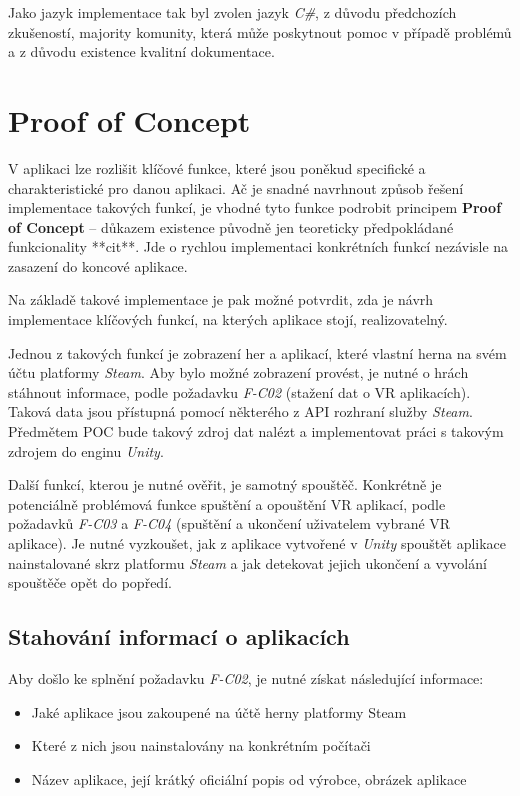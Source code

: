 Jako jazyk implementace tak byl zvolen jazyk \emph{C\#}, z důvodu
předchozích zkušeností, majority komunity, která může poskytnout pomoc v
případě problémů a z důvodu existence kvalitní dokumentace.

\section{Proof of Concept}\label{proof-of-concept}

V aplikaci lze rozlišit klíčové funkce, které jsou poněkud specifické a
charakteristické pro danou aplikaci. Ač je snadné navrhnout způsob
řešení implementace takových funkcí, je vhodné tyto funkce podrobit
principem \textbf{Proof of Concept} -- důkazem existence původně jen
teoreticky předpokládané funkcionality **cit**. Jde o rychlou implementaci
konkrétních funkcí nezávisle na zasazení do koncové aplikace.

Na základě takové implementace je pak možné potvrdit, zda je návrh
implementace klíčových funkcí, na kterých aplikace stojí,
realizovatelný.

Jednou z takových funkcí je zobrazení her a aplikací, které vlastní herna na svém
účtu platformy \emph{Steam}. Aby bylo možné zobrazení provést, je nutné
o hrách stáhnout informace, podle požadavku \emph{F-C02} (stažení dat o
VR aplikacích). Taková data jsou přístupná pomocí některého z API
rozhraní služby \emph{Steam}. Předmětem POC bude takový zdroj dat nalézt
a implementovat práci s takovým zdrojem do enginu \emph{Unity}.

Další funkcí, kterou je nutné ověřit, je samotný spouštěč. Konkrétně
je potenciálně problémová funkce spuštění a opouštění VR aplikací, podle
požadavků \emph{F-C03} a \emph{F-C04} (spuštění a ukončení uživatelem
vybrané VR aplikace). Je nutné vyzkoušet, jak z aplikace vytvořené v
\emph{Unity} spouštět aplikace nainstalované skrz platformu \emph{Steam}
a jak detekovat jejich ukončení a vyvolání spouštěče opět do popředí.

\subsection{Stahování informací o
aplikacích}\label{stahovuxe1nuxed-informacuxed-o-aplikacuxedch}

Aby došlo ke splnění požadavku \emph{F-C02}, je nutné získat následující
informace:

\begin{itemize}
\tightlist
\item
  Jaké aplikace jsou zakoupené na účtě herny platformy Steam
\item
  Které z nich jsou nainstalovány na konkrétním počítači
\item
  Název aplikace, její krátký oficiální popis od výrobce, obrázek
  aplikace
\end{itemize}

